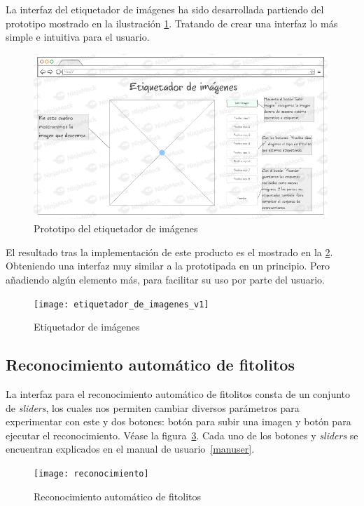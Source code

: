 La interfaz del etiquetador de imágenes ha sido desarrollada partiendo del prototipo mostrado en la ilustración \ref{fig:C.5.2}. Tratando de crear una interfaz lo más simple e intuitiva para el usuario.

\begin{figure}
\centering
\includegraphics[width=0.99\textwidth]{protototipo_etiquetador_de_imagenes}
\caption{Prototipo del etiquetador de imágenes}
\label{fig:C.5.2}
\end{figure}

El resultado tras la implementación de este producto es el mostrado en la \ref{fig:C.5.3}. Obteniendo una interfaz muy similar a la prototipada en un principio. Pero añadiendo algún elemento más, para facilitar su uso por parte del usuario.

\begin{figure}
\centering
\texttt{[image: etiquetador\_de\_imagenes\_v1]}
\caption{Etiquetador de imágenes}
\label{fig:C.5.3}
\end{figure}

\subsection{Reconocimiento automático de fitolitos}

La interfaz para el reconocimiento automático de fitolitos consta de un conjunto de \textit{sliders}, los cuales nos permiten cambiar diversos parámetros para experimentar con este y dos botones: botón para subir una imagen y botón para ejecutar el reconocimiento. Véase la figura~\ref{fig:C.5.4}. Cada uno de los botones y \textit{sliders} se encuentran explicados en el manual de usuario~\ref{manuser}.

\begin{figure}
\centering
\texttt{[image: reconocimiento]}
\caption{Reconocimiento automático de fitolitos}
\label{fig:C.5.4}
\end{figure}
